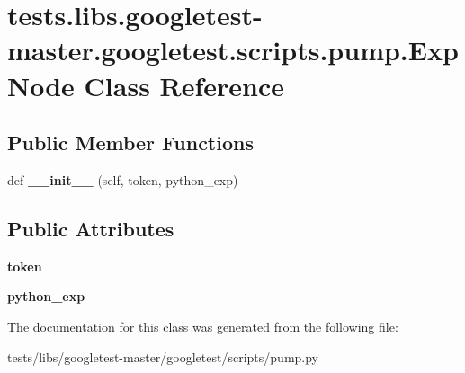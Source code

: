 \hypertarget{classtests_1_1libs_1_1googletest-master_1_1googletest_1_1scripts_1_1pump_1_1ExpNode}{}\section{tests.\+libs.\+googletest-\/master.googletest.\+scripts.\+pump.\+Exp\+Node Class Reference}
\label{classtests_1_1libs_1_1googletest-master_1_1googletest_1_1scripts_1_1pump_1_1ExpNode}
\subsection*{Public Member Functions}
\begin{DoxyCompactItemize}
\item 
\mbox{\label{classtests_1_1libs_1_1googletest-master_1_1googletest_1_1scripts_1_1pump_1_1ExpNode_a5e2d3f16ab344ed74a883418b5fb0d5e}} 
def {\bfseries \+\_\+\+\_\+init\+\_\+\+\_\+} (self, token, python\+\_\+exp)
\end{DoxyCompactItemize}
\subsection*{Public Attributes}
\begin{DoxyCompactItemize}
\item 
\mbox{\label{classtests_1_1libs_1_1googletest-master_1_1googletest_1_1scripts_1_1pump_1_1ExpNode_a51cdc1bc51342ddde10150ed7e10d26d}} 
{\bfseries token}
\item 
\mbox{\label{classtests_1_1libs_1_1googletest-master_1_1googletest_1_1scripts_1_1pump_1_1ExpNode_a1d5dd11bb938786abc3c3fa6e3d661ae}} 
{\bfseries python\+\_\+exp}
\end{DoxyCompactItemize}


The documentation for this class was generated from the following file\+:\begin{DoxyCompactItemize}
\item 
tests/libs/googletest-\/master/googletest/scripts/pump.\+py\end{DoxyCompactItemize}
